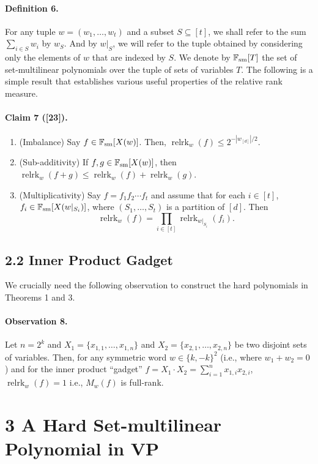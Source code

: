 \documentclass[10pt,a4paper]{article}
\begin{document}
\paragraph{Definition 6.} For any tuple $w=(w_1,\ldots,w_t)$ and a subset $S\subseteq[t]$, we shall refer to the sum $\sum_{i\in S}w_i$ by $w_S$. And by $w|_S$, we will refer to the tuple obtained by considering only the elements of $w$ that are indexed by $S$. We denote by $\mathbb F_{\rm sm}[T]$ the set of set-multilinear polynomials over the tuple of sets of variables $T$.
The following is a simple result that establishes various useful properties of the relative rank measure.
\paragraph{Claim 7 ([23]).}
\begin{enumerate}
\item (Imbalance) Say $f\in\mathbb F_{\rm sm}[X(w)]$. Then, $\operatorname{relrk}_w(f)\leq2^{-|w_{[d]}|/2}$.
\item (Sub-additivity) If $f,g\in\mathbb F_{\rm sm}[X(w)]$, then $\operatorname{relrk}_w(f+g)\leq\operatorname{relrk}_w(f)+\operatorname{relrk}_w(g)$.
\item (Multiplicativity) Say $f=f_1f_2\cdots f_t$ and assume that for each $i\in[t]$, $f_i\in\mathbb F_{\rm sm}[X(w|_{S_i})]$, where $(S_1,\ldots,S_t)$ is a partition of $[d]$. Then
\[\operatorname{relrk}_w(f)=\prod_{i\in[t]}\operatorname{relrk}_{w|_{S_i}}(f_i).\]
\end{enumerate}
\subsection*{2.2 Inner Product Gadget}
We crucially need the following observation to construct the hard polynomials in Theorems 1 and 3.
\paragraph{Observation 8.} Let $n=2^k$ and $X_1=\{x_{1,1},\ldots,x_{1,n}\}$ and $X_2=\{x_{2,1},\ldots,x_{2,n}\}$ be two disjoint sets of variables. Then, for any symmetric word $w\in\{k,-k\}^2$ (i.e., where $w_1+w_2=0$) and for the inner product ``gadget'' $f=X_1\cdot X_2=\sum_{i=1}^n x_{1,i}x_{2,i}$, $\operatorname{relrk}_w(f)=1$ i.e., $M_w(f)$ is full-rank.
\section*{3 A Hard Set-multilinear Polynomial in VP}
\end{document}
